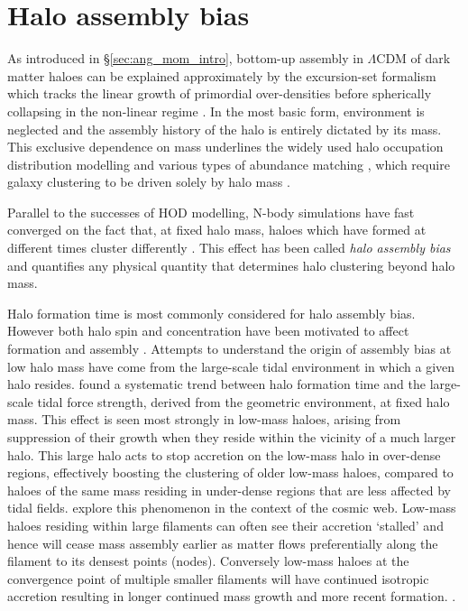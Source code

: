 \section{Halo assembly bias}
As introduced in \S\ref{sec:ang_mom_intro}, bottom-up assembly in $\Lambda$CDM of dark matter haloes can be explained approximately by the excursion-set formalism which tracks the linear growth of primordial over-densities before spherically collapsing in the non-linear regime \citep{press1974,bond1991}. In the most basic form, environment is neglected and the assembly history of the halo is entirely dictated by its mass. This exclusive dependence on mass underlines the widely used halo occupation distribution \citep[HOD; e.g.][]{jing1998,peacock2000} modelling and various types of abundance matching \citep[e.g.][]{kravtsov2004,conroy2006}, which require galaxy clustering to be driven solely by halo mass \citep[e.g.][]{mo1996,sheth1999}. 

Parallel to the successes of HOD modelling, N-body simulations have fast converged on the fact that, at fixed halo mass, haloes which have formed at different times cluster differently \citep[e.g.][]{gao2005,wechsler2006,croton2007,wang2011}. This effect has been called \textit{halo assembly bias} and quantifies any physical quantity that determines halo clustering beyond halo mass. 

Halo formation time is most commonly considered for halo assembly bias. However both halo spin and concentration have been motivated to affect formation and assembly \citep[e.g.][]{lacerna2012,lehmann2017}.  Attempts to understand the origin of assembly bias at low halo mass have come from the large-scale tidal environment in which a given halo resides. \citet{hahn2009} found a systematic trend between halo formation time and the large-scale tidal force strength, derived from the geometric environment, at fixed halo mass. This effect is seen most strongly in low-mass haloes, arising from suppression of their growth when they reside within the vicinity of a much larger halo. This large halo acts to stop accretion on the low-mass halo in over-dense regions, effectively boosting the clustering of older low-mass haloes, compared to haloes of the same mass residing in under-dense regions that are less affected by tidal fields. \citet{ZOMGI} explore this phenomenon in the context of the cosmic web. Low-mass haloes residing within large filaments can often see their accretion `stalled' and hence will cease mass assembly earlier as matter flows preferentially along the filament to its densest points (nodes). Conversely low-mass haloes at the convergence point of multiple smaller filaments will have continued isotropic accretion resulting in longer continued mass growth and more recent formation. \citep[See][for a theoretical approach]{musso2018}.

